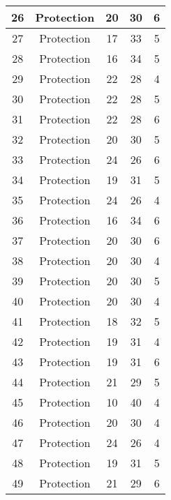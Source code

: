 \documentclass[results.tex]{subfiles}
\begin{document}
\begin{center}
\begin{tabular}{| c || c | c | c | c |}
    \hline
    26 & Protection & 20 & 30 & 6 \\ 
    \hline
    27 & Protection & 17 & 33 & 5 \\ 
    \hline
    28 & Protection & 16 & 34 & 5 \\ 
    \hline
    29 & Protection & 22 & 28 & 4 \\ 
    \hline
    30 & Protection & 22 & 28 & 5 \\ 
    \hline
    31 & Protection & 22 & 28 & 6 \\ 
    \hline
    32 & Protection & 20 & 30 & 5 \\ 
    \hline
    33 & Protection & 24 & 26 & 6 \\ 
    \hline
    34 & Protection & 19 & 31 & 5 \\ 
    \hline
    35 & Protection & 24 & 26 & 4 \\ 
    \hline
    36 & Protection & 16 & 34 & 6 \\ 
    \hline
    37 & Protection & 20 & 30 & 6 \\ 
    \hline
    38 & Protection & 20 & 30 & 4 \\ 
    \hline
    39 & Protection & 20 & 30 & 5 \\ 
    \hline
    40 & Protection & 20 & 30 & 4 \\ 
    \hline
    41 & Protection & 18 & 32 & 5 \\ 
    \hline
    42 & Protection & 19 & 31 & 4 \\ 
    \hline
    43 & Protection & 19 & 31 & 6 \\ 
    \hline
    44 & Protection & 21 & 29 & 5 \\ 
    \hline
    45 & Protection & 10 & 40 & 4 \\ 
    \hline
    46 & Protection & 20 & 30 & 4 \\ 
    \hline
    47 & Protection & 24 & 26 & 4 \\ 
    \hline
    48 & Protection & 19 & 31 & 5 \\ 
    \hline
    49 & Protection & 21 & 29 & 6 \\ 
    \hline   \end{tabular}
\end{center}
\end{document}
